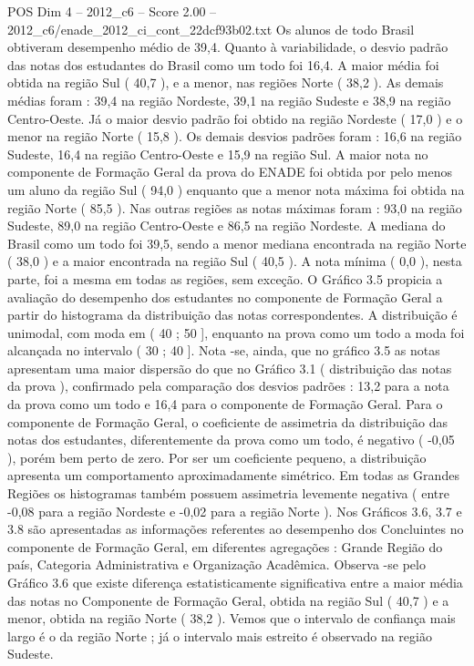 \begin{textsample}{POS Dim 4 – 2012\_c6 – Score 2.00 – 2012\_c6/enade\_2012\_ci\_cont\_22dcf93b02.txt}
Os alunos de todo Brasil obtiveram desempenho médio de 39,4.
Quanto à variabilidade, o desvio padrão das notas dos estudantes do Brasil como um todo foi 16,4.
A maior média foi obtida na região Sul ( 40,7 ), e a menor, nas regiões Norte ( 38,2 ).
As demais médias foram : 39,4 na região Nordeste, 39,1 na região Sudeste e 38,9 na região Centro-Oeste.
Já o maior desvio padrão foi obtido na região Nordeste ( 17,0 ) e o menor na região Norte ( 15,8 ).
Os demais desvios padrões foram : 16,6 na região Sudeste, 16,4 na região Centro-Oeste e 15,9 na região Sul.
A maior nota no componente de Formação Geral da prova do ENADE foi obtida por pelo menos um aluno da região Sul ( 94,0 ) enquanto que a menor nota máxima foi obtida na região Norte ( 85,5 ).
Nas outras regiões as notas máximas foram : 93,0 na região Sudeste, 89,0 na região Centro-Oeste e 86,5 na região Nordeste.
A mediana do Brasil como um todo foi 39,5, sendo a menor mediana encontrada na região Norte ( 38,0 ) e a maior encontrada na região Sul ( 40,5 ).
A nota mínima ( 0,0 ), nesta parte, foi a mesma em todas as regiões, sem exceção.
O Gráfico 3.5 propicia a avaliação do desempenho dos estudantes no componente de Formação Geral a partir do histograma da distribuição das notas correspondentes.
A distribuição é unimodal, com moda em ( 40 ; 50 ], enquanto na prova como um todo a moda foi alcançada no intervalo ( 30 ; 40 ].
Nota -se, ainda, que no gráfico 3.5 as notas apresentam uma maior dispersão do que no Gráfico 3.1 ( distribuição das notas da prova ), confirmado pela comparação dos desvios padrões : 13,2 para a nota da prova como um todo e 16,4 para o componente de Formação Geral.
Para o componente de Formação Geral, o coeficiente de assimetria da distribuição das notas dos estudantes, diferentemente da prova como um todo, é negativo ( -0,05 ), porém bem perto de zero.
Por ser um coeficiente pequeno, a distribuição apresenta um comportamento aproximadamente simétrico.
Em todas as Grandes Regiões os histogramas também possuem assimetria levemente negativa ( entre -0,08 para a região Nordeste e -0,02 para a região Norte ).
Nos Gráficos 3.6, 3.7 e 3.8 são apresentadas as informações referentes ao desempenho dos Concluintes no componente de Formação Geral, em diferentes agregações : Grande Região do país, Categoria Administrativa e Organização Acadêmica.
Observa -se pelo Gráfico 3.6 que existe diferença estatisticamente significativa entre a maior média das notas no Componente de Formação Geral, obtida na região Sul ( 40,7 ) e a menor, obtida na região Norte ( 38,2 ).
Vemos que o intervalo de confiança mais largo é o da região Norte ; já o intervalo mais estreito é observado na região Sudeste.

\end{textsample}
